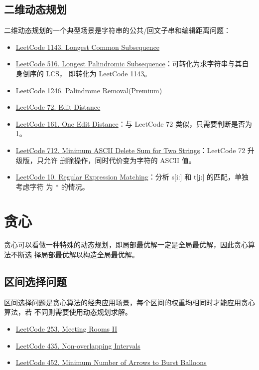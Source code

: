 \subsection{二维动态规划}
二维动态规划的一个典型场景是字符串的公共/回文子串和编辑距离问题：
\begin{itemize}
  \item
    \href{https://leetcode.com/problems/longest-common-subsequence/}{LeetCode 1143. Longest Common Subsequence}
  \item
    \href{https://leetcode.com/problems/longest-palindromic-subsequence/}{LeetCode
      516. Longest Palindromic Subsequence}：可转化为求字符串与其自身倒序的 LCS，
    即转化为 LeetCode 1143。
  \item
    \href{https://leetcode.com/problems/palindrome-removal/}{LeetCode 1246. Palindrome Removal(Premium)}
  \item
    \href{https://leetcode.com/problems/edit-distance/}{LeetCode 72. Edit Distance}
  \item
    \href{https://leetcode.com/problems/one-edit-distance}{LeetCode 161. One
      Edit Distance}：与 LeetCode 72 类似，只需要判断是否为 1。
  \item
    \href{https://leetcode.com/problems/minimum-ascii-delete-sum-for-two-strings/}{LeetCode
      712. Minimum ASCII Delete Sum for Two Strings}：LeetCode 72 升级版，只允许
    删除操作，同时代价变为字符的 ASCII 值。
  \item
    \href{https://leetcode.com/problems/regular-expression-matching/}{LeetCode
      10. Regular Expression Matching}：分析 s[i:] 和 t[j:] 的匹配，单独考虑字符
    为 * 的情况。
\end{itemize}

\section{贪心}
贪心可以看做一种特殊的动态规划，即局部最优解一定是全局最优解，因此贪心算法不断选
择局部最优解以构造全局最优解。

\subsection{区间选择问题}
区间选择问题是贪心算法的经典应用场景，每个区间的权重均相同时才能应用贪心算法，若
不同则需要使用动态规划求解。

\begin{itemize}
  \item 
    \href{https://leetcode.com/problems/meeting-rooms-ii}{LeetCode 253. Meeting
      Rooms II}
  \item
    \href{https://leetcode.com/problems/non-overlapping-intervals/}{LeetCode
      435. Non-overlapping Intervals}
  \item
    \href{https://leetcode.com/problems/minimum-number-of-arrows-to-burst-balloons/}{LeetCode
      452. Minimum Number of Arrows to Burst Balloons}
\end{itemize}

